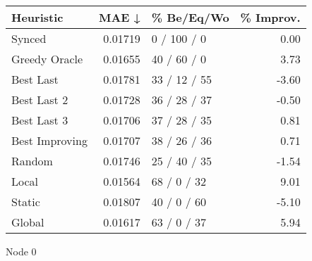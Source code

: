 \begin{tabular}{lrlr}
\toprule
\textbf{Heuristic} & \textbf{MAE ↓} & \textbf{\% Be/Eq/Wo} & \textbf{\% Improv.} \\
\midrule
            Synced &        0.01719 &          0 / 100 / 0 &                0.00 \\
     Greedy Oracle &        0.01655 &          40 / 60 / 0 &                3.73 \\
         Best Last &        0.01781 &         33 / 12 / 55 &               -3.60 \\
       Best Last 2 &        0.01728 &         36 / 28 / 37 &               -0.50 \\
       Best Last 3 &        0.01706 &         37 / 28 / 35 &                0.81 \\
    Best Improving &        0.01707 &         38 / 26 / 36 &                0.71 \\
            Random &        0.01746 &         25 / 40 / 35 &               -1.54 \\
             Local &        0.01564 &          68 / 0 / 32 &                9.01 \\
            Static &        0.01807 &          40 / 0 / 60 &               -5.10 \\
            Global &        0.01617 &          63 / 0 / 37 &                5.94 \\
\bottomrule
\end{tabular}
\caption{Node 0}
\label{tab:non_lr01_le1_bs2_0}
